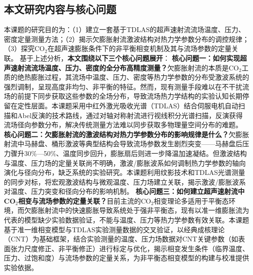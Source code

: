 	\subsection{本文研究内容与核心问题}
	本课题的研究目的为：（1）建立一套基于TDLAS的超声速射流流场温度、压力、密度定量测量方法；（2）揭示欠膨胀射流激波结构对热力学参数分布的调控规律；（3）探究CO$_2$在超声速膨胀条件下的非平衡相变机制及其与流场参数的定量关联。
	基于上述分析，\textbf{本文围绕以下三个核心问题展开}：
	\textbf{核心问题一：如何实现超声速射流流场温度、压力、密度的全分布高精度测量？}欠膨胀射流的本质是CO$_2$工质的绝热膨胀过程，其流场中温度、压力、密度等热力学参数的分布受激波系统的强烈调制，呈现高度非均匀、非平衡的特征。然而，现有测量手段难以在不干扰流场的前提下同步获取这些参数的全场分布，导致流场热力学结构的实验认知长期停留在定性层面。本课题采用中红外激光吸收光谱（TDLAS）结合伺服电机自动扫描和Abel反演的技术路线，通过对轴对称射流进行视线积分光谱扫描，反演获得流场径向参数分布，解决传统测量方法难以同步获取多物理量空间分布的难题。
	\textbf{核心问题二：欠膨胀射流的激波结构对热力学参数分布的影响规律是什么？}欠膨胀射流中马赫盘、桶形激波等典型结构会导致流场参数发生剧烈突变——马赫盘后压力骤升30\%—50\%、温度同步回升，膨胀扇后则进一步降温加速凝结。但激波结构与温度、压力场的定量关联尚不明确，激波/膨胀波系如何调制热力学参数的轴向演化与径向分布，缺乏系统的实验研究。本课题利用纹影技术和TDLAS光谱测量的同步对标，将宏观激波结构与微观温度、压力场建立关联，揭示激波/膨胀波系对温度、压力突变和径向分布的影响机制。
	\textbf{核心问题三：如何建立超声速射流中CO$_2$相变与流场参数的定量关联？}目前主流的CO$_2$相变理论多适用于平衡态环境，而欠膨胀射流中的快速膨胀导致系统处于强非平衡态，现有以准一维膨胀流为代表的模型缺少实验数据验证，不能与温度、压力等热力学参数有效关联。本课题基于准一维相变模型与TDLAS实验测量数据的交叉验证，以经典成核理论（CNT）为基础框架，结合实验测量的温度、压力场数据对CNT关键参数（如表面张力尺度修正、非平衡修正）进行标定与优化，揭示相变发生条件（临界温度、压力、过饱和度）与流场参数的定量关系，为非平衡态相变模型的构建与校准提供实验依据。

